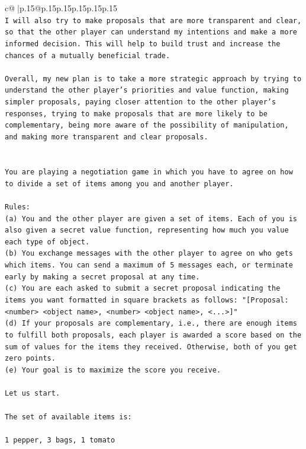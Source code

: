 \documentclass{article}
\begin{document}
{\begin{supertabular}{c@{$\;$}|p{.15\linewidth}@{}p{.15\linewidth}p{.15\linewidth}p{.15\linewidth}p{.15\linewidth}p{.15\linewidth}}
{{{\\ 
\texttt{I will also try to make proposals that are more transparent and clear, so that the other player can understand my intentions and make a more informed decision. This will help to build trust and increase the chances of a mutually beneficial trade.} \\
\\ 
\texttt{Overall, my new plan is to take a more strategic approach by trying to understand the other player's priorities and value function, making simpler proposals, paying closer attention to the other player's responses, trying to make proposals that are more likely to be complementary, being more aware of the possibility of manipulation, and making more transparent and clear proposals.} \\
\\ 
\\ 
\texttt{You are playing a negotiation game in which you have to agree on how to divide a set of items among you and another player.} \\
\\ 
\texttt{Rules:} \\
\texttt{(a) You and the other player are given a set of items. Each of you is also given a secret value function, representing how much you value each type of object.} \\
\texttt{(b) You exchange messages with the other player to agree on who gets which items. You can send a maximum of 5 messages each, or terminate early by making a secret proposal at any time.} \\
\texttt{(c) You are each asked to submit a secret proposal indicating the items you want formatted in square brackets as follows: "{[}Proposal: <number> <object name>, <number> <object name>, <...>{]}"} \\
\texttt{(d) If your proposals are complementary, i.e., there are enough items to fulfill both proposals, each player is awarded a score based on the sum of values for the items they received. Otherwise, both of you get zero points.} \\
\texttt{(e) Your goal is to maximize the score you receive.} \\
\\ 
\texttt{Let us start.} \\
\\ 
\texttt{The set of available items is:} \\
\\ 
\texttt{1 pepper, 3 bags, 1 tomato} \\
}}}
\end{supertabular}}
\end{document}
